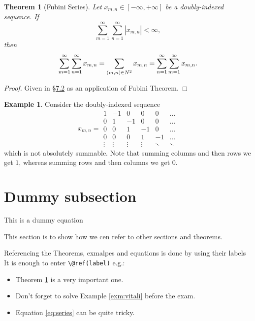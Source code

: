 \documentclass[
]{book}
\providecommand{\tightlist}{%
  \setlength{\itemsep}{0pt}\setlength{\parskip}{0pt}}
\let\mathbb\relax %
\newcommand{\N}{\mathbb{N}}
\newtheorem{theorem}{Theorem}[chapter]
\theoremstyle{definition}
\theoremstyle{definition}
\newtheorem{example}{Example}[chapter]
\theoremstyle{definition}
\theoremstyle{definition}
\theoremstyle{remark}
\begin{document}
\begin{theorem}[Fubini Series]
\protect\hypertarget{thm:seriesfubini}{}\label{thm:seriesfubini}Let
\(x_{m,n} \in [-\infty,+\infty]\) be a doubly-indexed sequence. If
\[\sum_{m=1}^\infty
\sum_{n=1}^\infty
|x_{m,n}|
<\infty
,\] then \[\sum_{m=1}^\infty
\sum_{n=1}^\infty
x_{m,n}
=
\sum_{(m,n)\in\N^2} x_{m,n}
=
\sum_{n=1}^\infty
\sum_{m=1}^\infty
x_{m,n}
.\]
\end{theorem}

\begin{proof}
Given in §\protect\hyperlink{sub:fubini}{7.2} as an application of Fubini Theorem.
\end{proof}

\begin{example}
Consider the doubly-indexed sequence \[x_{m,n}=
\begin{array}{|rrrrrr}
\hline
1 & -1 & 0 & 0 & 0 & \dots
\\
0 & 1 & -1 & 0 & 0 & \dots
\\
0 & 0 & 1 & -1 & 0 & \dots
\\
0 & 0 & 0 & 1 & -1 & \dots
\\
\vdots &
\vdots &
\vdots &
\vdots &
\ddots &
\ddots
\end{array}\] which is not absolutely summable. Note that summing
columns and then rows we get \(1\), whereas summing rows and then columns
we get \(0\).
\end{example}

\hypertarget{sub:dummy}{%
\section{Dummy subsection}\label{sub:dummy}}

This is a dummy equation

This section is to show how we cen refer to other sections and theorems.

Referencing the Theorems, exmalpes and equations is done by using their labels
It is enough to enter \texttt{\textbackslash{}@ref(label)} e.g.:

\begin{itemize}
\tightlist
\item
  Theorem \ref{thm:seriesfubini} is a very important one.
\item
  Don't forget to solve Example \ref{exm:vitali} before the exam.
\item
  Equation \eqref{eq:series} can be quite tricky.
\end{itemize}
\end{document}
